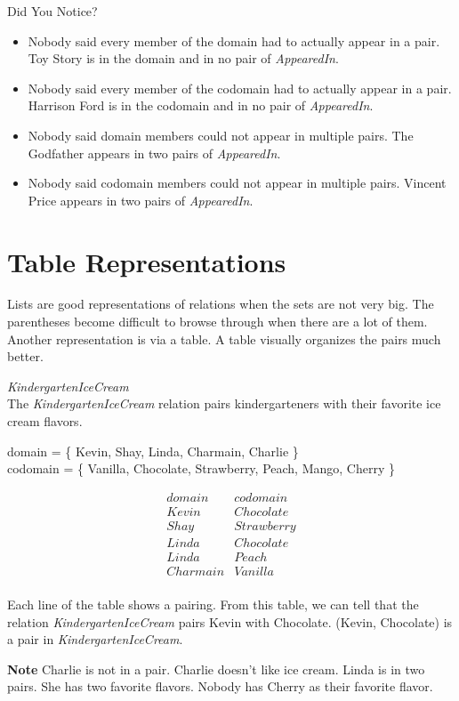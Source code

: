 \documentclass{ximera}
\begin{document}
\begin{warning} Did You Notice? \\
\begin{itemize}
\item Nobody said every member of the domain had to actually appear in a pair.  Toy Story is in the domain and in no pair of \textit{AppearedIn}.
\item Nobody said every member of the codomain had to actually appear in a pair.  Harrison Ford is in the codomain and in no pair of \textit{AppearedIn}.
\item Nobody said domain members could not appear in multiple pairs.  The Godfather appears in two pairs of \textit{AppearedIn}.
\item Nobody said codomain members could not appear in multiple pairs.  Vincent Price appears in two pairs of \textit{AppearedIn}.
\end{itemize}
\end{warning}




\section{Table Representations}



Lists are good representations of relations when the sets are not very big. The parentheses become difficult to browse through when there are a lot of them. Another representation is via a table. A table visually organizes the pairs much better.

\begin{example} \textit{KindergartenIceCream} \\
The \textit{KindergartenIceCream} relation pairs kindergarteners with their favorite ice cream flavors.

domain = \{ Kevin, Shay, Linda, Charmain, Charlie \}  \\
codomain = \{ Vanilla, Chocolate, Strawberry, Peach, Mango, Cherry \} 

\[
\begin{array}{l|l}
    domain      & codomain      \\ \hline
    Kevin   &  Chocolate \\
    Shay   & Strawberry \\
    Linda  &  Chocolate \\
    Linda  &  Peach \\
    Charmain &  Vanilla \\ 
\end{array}
\]


Each line of the table shows a pairing. From this table, we can tell that the relation \textit{KindergartenIceCream} pairs Kevin with Chocolate.  (Kevin, Chocolate) is a pair in \textit{KindergartenIceCream}.

\textbf{Note} Charlie is not in a pair.  Charlie doesn't like ice cream. Linda is in two pairs.  She has two favorite flavors.  Nobody has Cherry as their favorite flavor.

\end{example} 
\end{document}
